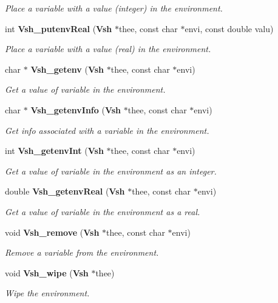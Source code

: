 \begin{DoxyCompactItemize}
\begin{DoxyCompactList}\small\item\em Place a variable with a value (integer) in the environment. \end{DoxyCompactList}\item 
int {\bf Vsh\-\_\-putenv\-Real} ({\bf Vsh} $\ast$thee, const char $\ast$envi, const double valu)
\begin{DoxyCompactList}\small\item\em Place a variable with a value (real) in the environment. \end{DoxyCompactList}\item 
char $\ast$ {\bf Vsh\-\_\-getenv} ({\bf Vsh} $\ast$thee, const char $\ast$envi)
\begin{DoxyCompactList}\small\item\em Get a value of variable in the environment. \end{DoxyCompactList}\item 
char $\ast$ {\bf Vsh\-\_\-getenv\-Info} ({\bf Vsh} $\ast$thee, const char $\ast$envi)
\begin{DoxyCompactList}\small\item\em Get info associated with a variable in the environment. \end{DoxyCompactList}\item 
int {\bf Vsh\-\_\-getenv\-Int} ({\bf Vsh} $\ast$thee, const char $\ast$envi)
\begin{DoxyCompactList}\small\item\em Get a value of variable in the environment as an integer. \end{DoxyCompactList}\item 
double {\bf Vsh\-\_\-getenv\-Real} ({\bf Vsh} $\ast$thee, const char $\ast$envi)
\begin{DoxyCompactList}\small\item\em Get a value of variable in the environment as a real. \end{DoxyCompactList}\item 
void {\bf Vsh\-\_\-remove} ({\bf Vsh} $\ast$thee, const char $\ast$envi)
\begin{DoxyCompactList}\small\item\em Remove a variable from the environment. \end{DoxyCompactList}\item 
void {\bf Vsh\-\_\-wipe} ({\bf Vsh} $\ast$thee)
\begin{DoxyCompactList}\small\item\em Wipe the environment. \end{DoxyCompactList}\item 

\end{DoxyCompactItemize}
